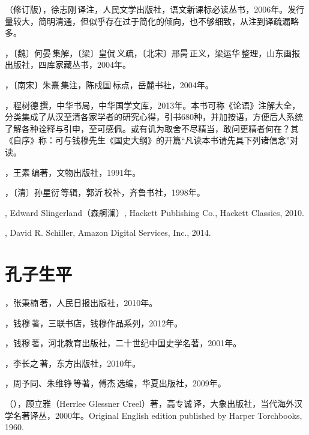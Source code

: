（修订版），徐志刚\,译注，人民文学出版社，语文新课标必读丛书，2006年。发行量较大，简明清通，但似乎存在过于简化的倾向，也不够细致，从注到译疏漏略多。

，〔魏〕何晏\,集解，〔梁〕皇侃\,义疏，〔北宋〕邢昺\,正义，梁运华\,整理，山东画报出版社，四库家藏丛书，2004年。

，〔南宋〕朱熹\,集注，陈戍国\,标点，岳麓书社，2004年。

，程树德\,撰，中华书局，中华国学文库，2013年。本书可称《论语》注解大全，分类集成了从汉至清各家学者的研究心得，引书680种，并加按语，方便后人系统了解各种诠释与引申，至可感佩。或有讥为取舍不尽精当，敢问更精者何在？其《自序》称：可与钱穆先生《国史大纲》的开篇“凡读本书请先具下列诸信念”对读。

，王素\,编著，文物出版社，1991年。

，〔清〕孙星衍\,等辑，郭沂\,校补，齐鲁书社，1998年。

, Edward Slingerland（森舸澜）, Hackett Publishing Co., Hackett Classics, 2010.

, David R. Schiller, Amazon Digital Services, Inc., 2014.


\lypdfbookmark\section*{孔子生平}

，张秉楠\,著，人民日报出版社，2010年。

，钱穆\,著，三联书店，钱穆作品系列，2012年。

，钱穆\,著，河北教育出版社，二十世纪中国史学名著，2001年。

，李长之\,著，东方出版社，2010年。

，周予同、朱维铮\,等著，傅杰\,选编，华夏出版社，2009年。

（），顾立雅（Herrlee Glessner Creel）著，高专诚\,译，大象出版社，当代海外汉学名著译丛，2000年。Original English edition published by Harper Torchbooks, 1960.

